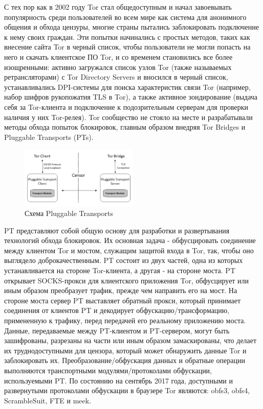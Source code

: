 С тех пор как в 2002 году Tor стал общедоступным и начал завоевывать популярность среди пользователей во всем мире как система для анонимного общения и обхода цензуры,
многие страны пытались заблокировать подключение к нему своих граждан. Эти попытки начинались с простых методов, таких как внесение сайта Tor в черный список,
чтобы пользователи не могли попасть на него и скачать клиентское ПО Tor, и со временем становились все более изощренными:
активно загружался список узлов Tor (также называемых ретрансляторами) с Tor Directory Servers и вносился в черный список,
устанавливались DPI-системы для поиска характеристик связи Tor (например, набор шифров рукопожатия TLS в Tor), а также активное зондирование
(выдача себя за Tor-клиента и подключение к подозрительным серверам для проверки наличия у них Tor-релея).
Tor сообщество не стояло на месте и разрабатывали методы обхода попыток блокировок, главным образом внедряя Tor Bridges и Pluggable Transports (PTs).

\begin{figure}[h!]
    \begin{center}
        \includegraphics[width = 0.5\textwidth]{tor_pt.png}
        \caption{Схема Pluggable Transports}
    \end{center}
\end{figure}

PT представляют собой общую основу для разработки и развертывания технологий обхода блокировок.
Их основная задача - обфусцировать соединение между клиентом Tor и мостом, служащим защитой входа в Tor, так, чтобы оно выглядело доброкачественным.
PT состоит из двух частей, одна из которых устанавливается на стороне Tor-клиента, а другая - на стороне моста.
PT открывает SOCKS-прокси для клиентского приложения Tor, обфусцирует или иным образом преобразует трафик, прежде чем направить его на мост.
На стороне моста сервер PT выставляет обратный прокси, который принимает соединения от клиентов PT и декодирует обфускацию/трансформацию,
примененную к трафику, перед передачей его реальному приложению моста.
Данные, передаваемые между PT-клиентом и PT-сервером, могут быть зашифрованы, разрезаны на части или иным образом замаскированы,
что делает их труднодоступными для цензора, который может обнаружить данные Tor и заблокировать их.
Преобразование/обфускация данных и обратные операции выполняются транспортными модулями/протоколами обфускации, используемыми PT.
По состоянию на сентябрь 2017 года, доступными и развернутыми протоколами обфускации в браузере Tor являются: obfs3, obfs4, ScrambleSuit, FTE и meek.

